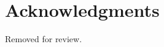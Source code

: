 \documentclass{ICLSarticle} %
\author{Author Name, Institution, Email \and Author Name 2, Institution, Email \and Author Name 3, Institution, Email%

\vspace{-9.5ex}} %
\begin{document}
\maketitle






\printbibliography[title={References}]

\section{Acknowledgments}

Removed for review.
\end{document}
